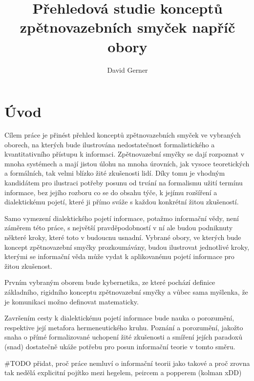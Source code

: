 \documentclass[11pt,a4paper]{article}
\author{David Gerner}
\title{Přehledová studie konceptů zpětnovazebních smyček napříč obory}
\begin{document}
\begin{titlepage}
\maketitle
\end{titlepage}

\tableofcontents
\pagebreak

\section*{Úvod}

Cílem práce je přinést přehled konceptů zpětnovazebních smyček ve vybraných oborech, na kterých bude ilustrována nedostatečnost formalistického a kvantitativního přístupu k informaci. Zpětnovazební smyčky se dají rozpoznat v mnoha systémech a mají jistou úlohu na mnoha úrovních, jak vysoce teoretických a formálních, tak velmi blízko žité zkušenosti lidí. Díky tomu je vhodným kandidátem pro ilustraci potřeby posunu od trvání na formalismu užití termínu informace, bez jejího rozboru co se do obsahu týče, k jejímu rozšíření a dialektickému pojetí, které ji přímo sváže s každou konkrétní žitou zkušeností. 

Samo vymezení dialektického pojetí informace, potažmo informační vědy, není záměrem této práce, s největší pravděpodobností v ní ale budou podniknuty některé kroky, které toto v budoucnu usnadní. Vybrané obory, ve kterých bude koncept zpětnovazební smyčky prozkoumávány, budou ilustrovat jednotlivé kroky, kterými se informační věda může vydat k aplikovanému pojetí informace pro žitou zkušenost.

Prvním vybraným oborem bude kybernetika, ze které pochází definice základního, rigidního konceptu zpětnovazební smyčky a vůbec sama myšlenka, že je komunikaci možno definovat matematicky.

Završením cesty k dialektickému pojetí informace bude nauka o porozumění, respektive její metafora hermeneutického kruhu. Poznání a porozumění, jakožto snaha o přímé formalizované uchopení žité zkušenosti a smíření jejích paradoxů (snad) dostatečně ukáže potřebu pro posun informační teorie v tomto směru.


#TODO přidat, proč práce nemluví o informační teorii jako takové a proč zrovna tak nedělá explicitní pojítko mezi hegelem, peircem a popperem (kolman xDD)

\end{document}
